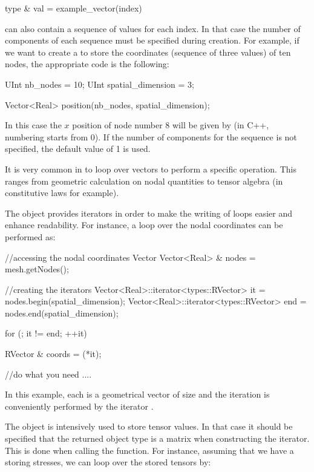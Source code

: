 \begin{cpp}
  type & val = example_vector(index)
\end{cpp}

 can also contain a sequence of values for each
index. In that case the number of components of each sequence must be
specified during  creation.  For example, if we want to
create a  to store the coordinates (sequence of three
values) of ten nodes, the appropriate code is the following:
\begin{cpp}
  UInt nb_nodes = 10;
  UInt spatial_dimension = 3;

  Vector<Real> position(nb_nodes, spatial_dimension);
\end{cpp}
In this case the $x$ position of node number 8 will be given by
 (in C++, numbering starts from 0). If the number of
components for the sequence is not specified, the default value of 1 is used.

It is very common in \akantu to loop over vectors to perform a specific
operation. This ranges from geometric calculation on nodal quantities
to tensor algebra (in constitutive laws for example).

The  object provides iterators
in order to make the writing of loops easier and enhance readability.
For instance, a loop over the nodal coordinates can be performed as:
\begin{cpp}
  //accessing the nodal coordinates Vector
  Vector<Real> & nodes = mesh.getNodes();

  //creating the iterators
  Vector<Real>::iterator<types::RVector> it  = nodes.begin(spatial_dimension);
  Vector<Real>::iterator<types::RVector> end = nodes.end(spatial_dimension);

  for (; it != end; ++it){
    RVector & coords = (*it);

    //do what you need
    ....
  }
\end{cpp}
In this example, each  is a geometrical vector of size 
and the iteration is conveniently performed by the  iterator .

The  object is intensively used to store tensor values.  In that
case it should be specified that the returned object type is a matrix when
constructing the iterator. This is done when calling the  function. For
instance, assuming that we have a  storing stresses, we can loop
over the stored tensors by:

